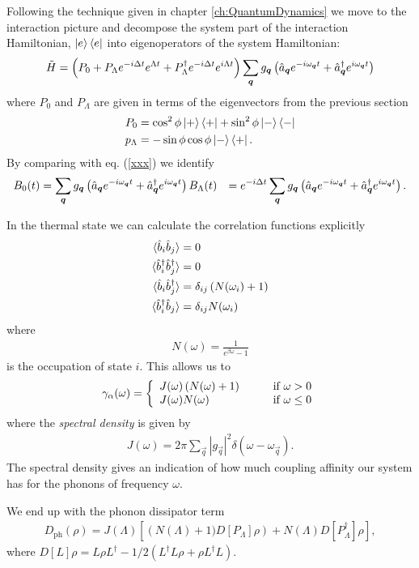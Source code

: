 Following the technique given in chapter \ref{ch:QuantumDynamics} we move to the interaction picture and decompose the system part of the interaction Hamiltonian, $\left\vert e\right\rangle\left\langle e\right\vert$ into eigenoperators of the system Hamiltonian:
\begin{align}
  \tilde{H} = \left(P_0 + P_\Lambda e^{-i\Delta t}e^{\Lambda t} + P^\dagger_\Lambda e^{-i\Delta t} e^{i\Lambda t}\right)\sum_{{\boldsymbol{q}}}g_{{\boldsymbol{q}}}\left(\hat{a}_{{\boldsymbol{q}}}e^{-i\omega_{{\boldsymbol{q}}} t} + \hat{a}^\dagger_{{\boldsymbol{q}}} e^{i\omega_{{\boldsymbol{q}}} t} \right)
\end{align}
where $P_0$ and $P_\Lambda$ are given in terms of the eigenvectors from the previous section
\begin{align}
  P_0 &= \cos^2\phi \left\vert+\right\rangle\left\langle +\right\vert + \sin^2\phi \left\vert-\right\rangle\left\langle -\right\vert \\
  p_\Lambda &= -\sin\phi \cos\phi \left\vert-\right\rangle\left\langle +\right\vert.
\end{align}
By comparing with eq. (\ref{xxx}) we identify
\begin{align}
  B_0(t) &= \sum_{{\boldsymbol{q}}} g_{{\boldsymbol{q}}} \left(\hat{a}_{{\boldsymbol{q}}} e^{-i\omega_{{\boldsymbol{q}}} t} + \hat{a}^\dagger_{{\boldsymbol{q}}} e^{i\omega_{{\boldsymbol{q}}} t}\right)
  B_\Lambda(t) &= e^{-i\Delta t}\sum_{{\boldsymbol{q}}} g_{{\boldsymbol{q}}} \left(\hat{a}_{{\boldsymbol{q}}} e^{-i\omega_{{\boldsymbol{q}}} t} + \hat{a}^\dagger_{{\boldsymbol{q}}} e^{i\omega_{{\boldsymbol{q}}} t}\right).
\end{align}

In the thermal state we can calculate the correlation functions explicitly
\begin{align}
  \langle \hat{b}_i \hat{b}_j \rangle &= 0 \\
  \langle \hat{b}^\dagger_i \hat{b}^\dagger_j \rangle &= 0 \\
  \langle \hat{b}_i \hat{b}^\dagger_j \rangle &= \delta_{ij} \left( N(\omega_i) +1 \right) \\
  \langle \hat{b}^\dagger_i \hat{b}_j \rangle &= \delta_{ij} N(\omega_i)
\end{align}
where
\begin{align}
  N(\omega) = \frac{1}{e^{\beta \omega} - 1}
\end{align}
is the occupation of state $i$. This allows us to 
\begin{align}
  \gamma_\alpha(\omega) = \left\{
    \begin{array}{l l}
    J(\omega)\left(N(\omega) + 1\right) & \qquad \text{if $\omega > 0$}\\
    J(\omega)N(\omega) & \qquad \text{if $\omega \leq 0$}
  \end{array} \right.
\end{align}
where the \textit{spectral density} is given by
\begin{align}
  J(\omega) = 2\pi \sum_\vec{q} |g_\vec{q}|^2 \delta(\omega-\omega_\vec{q}).
\end{align}
The spectral density gives an indication of how much coupling affinity our system has for the phonons of frequency $\omega$.

We end up with the phonon dissipator term
\begin{align}
  D_\text{ph}(\rho) = J(\Lambda)\left[\left(N(\Lambda) + 1)D[P_\Lambda]\rho\right) + N(\Lambda)D[P^\dagger_\Lambda]\rho \right],
\end{align}
where $D[L]\rho = L\rho L^\dagger -1/2(L^\dagger L\rho + \rho L^\dagger L)$.

